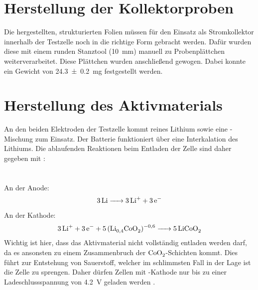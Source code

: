 \documentclass[a4paper, 11pt, headsepline,footsepline,twoside,abstract]{scrbook}
\begin{document}
\section{Herstellung der Kollektorproben}
Die hergestellten, strukturierten Folien müssen für den Einsatz als Stromkollektor innerhalb der Testzelle noch in die richtige Form gebracht werden. Dafür wurden diese mit einem runden Stanztool (\SI{10}{\milli\meter}) manuell zu Probenplättchen weiterverarbeitet. Diese Plättchen wurden anschließend gewogen. Dabei konnte ein Gewicht von \SI{24.3 \pm 0.2}{\milli\gram} festgestellt werden.
\section{Herstellung des Aktivmaterials}
An den beiden Elektroden der Testzelle kommt reines Lithium sowie eine -Mischung zum Einsatz. Der Batterie funktioniert über eine Interkalation des Lithiums. Die ablaufenden Reaktionen beim Entladen der Zelle sind daher gegeben mit \cite{bub_skript}: \\\\
\\%
An der Anode:\\
\begin{equation}
	\ce{3Li ->  3Li+ + 3e-}
\end{equation}
An der Kathode:\\
\begin{equation}
	\ce{3Li+ + 3e- + 5(Li_{0,4}CoO2)^{-0,6} -> 5LiCoO2}
\end{equation}
Wichtig ist hier, dass das Aktivmaterial nicht vollständig entladen werden darf, da es ansonsten zu einem Zusammenbruch der $\ce{CoO2}$-Schichten kommt. Dies führt zur Entstehung von Sauerstoff, welcher im schlimmsten Fall in der Lage ist die Zelle zu sprengen. Daher dürfen Zellen mit -Kathode nur bis zu einer Ladeschlussspannung von \SI{4.2}{\volt} geladen werden \cite{bub_skript}.
\end{document}
